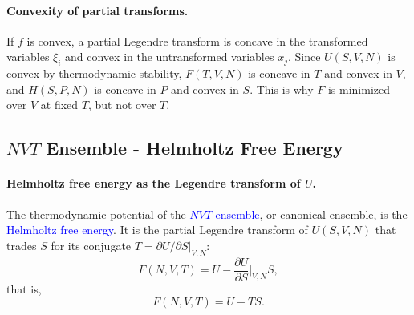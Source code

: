 \paragraph{Convexity of partial transforms.}
If $f$ is convex, a partial Legendre transform is concave in the transformed
variables $\xi_i$ and convex in the untransformed variables $x_j$. Since
$U(S,V,N)$ is convex by thermodynamic stability, $F(T,V,N)$ is concave in
$T$ and convex in $V$, and $H(S,P,N)$ is concave in $P$ and convex in $S$.
This is why $F$ is minimized over $V$ at fixed $T$, but not over $T$.

\subsection{$NVT$ Ensemble - Helmholtz Free Energy}

\paragraph{Helmholtz free energy as the Legendre transform of $U$.}
The thermodynamic potential of the \textcolor{blue}{$NVT$ ensemble}, or
canonical ensemble, is the \textcolor{blue}{Helmholtz free energy}. It is the
partial Legendre transform of $U(S,V,N)$ that trades $S$ for its conjugate
$T=\partial U/\partial S|_{V,N}$:
\begin{equation*}
    F(N,V,T)=U-\frac{\partial U}{\partial S}\bigg|_{V,N}S,
\end{equation*}
that is,
\begin{equation}
    \boxed{F(N,V,T)=U-TS.}
\end{equation}

